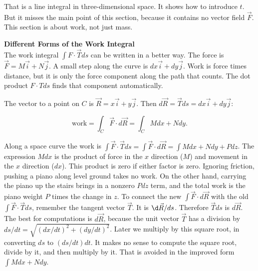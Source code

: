 That is a line integral in three-dimensional space. It shows how to introduce $t$. But
it misses the main point of this section, because it contains no vector field $\vec F$. This
section is about work, not just mass.

\noindent\textbf{\large Different Forms of the Work Integral}\\

The work integral $\int F \cdot \vec T ds$ can be written in a better way. The force is $\vec F = M\vec i + N\vec j$.
A small step along the curve is $dx \vec i + dy \vec j$. Work is force times distance, but it is only
the force component along the path that counts. The dot product $F\cdot T ds$ finds that
component automatically. 

The vector to a point on $C$ is $\vec R = x\vec i + y\vec j$. Then $d\vec R = \vec T ds = dx \vec i + dy \vec j$:

$$\text{work}=\int_C\vec F \cdot d\vec R=\int_C M dx+N dy.$$ 

Along a space curve the work is $\int \vec F \cdot \vec T ds=\int \vec F \cdot d \vec R=\int M dx+N dy +P dz$.
The expression $M dx$ is the product of force in the $x$ direction ($M$) and movement in the $x$ direction ($dx$). This product is zero if
either factor is zero. Ignoring friction, pushing a piano along level ground takes no work.
On the other hand, carrying the piano up the stairs brings in a nonzero $P dz$ term, and the total
work is the piano weight $P$ times the change in $z$.
To connect the new $\int \vec F \cdot d\vec R$ with the old $\int \vec F \cdot \vec T ds$, remember the tangent vector
$\vec T$. It is $\d\vec R/ds$. Therefore $\vec T ds$ is $d\vec R$. The best for computations is $d\vec R$, because the
unit vector $\vec T$ has a division by $ds/dt = \sqrt{(dx/dt)^2 + (dy/dt)^2}$. Later we multiply by this
square root, in converting $ds$ to $(ds/dt)dt$. It makes no sense to compute the square
root, divide by it, and then multiply by it. That is avoided in the improved form
$\int Mdx+Ndy$.


